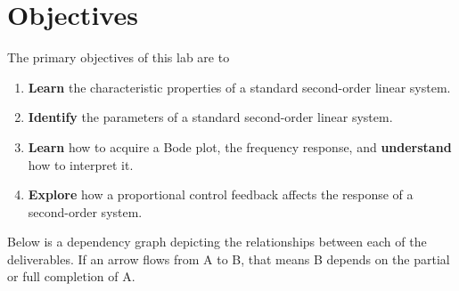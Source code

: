 \section{Objectives}
The primary objectives of this lab are to
\begin{enumerate}[label=(\arabic*)]
  \item{
    \textbf{Learn} the characteristic properties of a standard second-order linear system.
  }
  \item{
    \textbf{Identify} the parameters of a standard second-order linear system.
  }
  \item{
    \textbf{Learn} how to acquire a Bode plot, the frequency response,
    and \textbf{understand} how to interpret it.
  }
  \item{
    \textbf{Explore} how a proportional control feedback affects the response
    of a second-order system.
  }
\end{enumerate}
Below is a dependency graph depicting the relationships between each of the
deliverables. If an arrow flows from A to B, that means B depends on the
partial or full completion of A.
